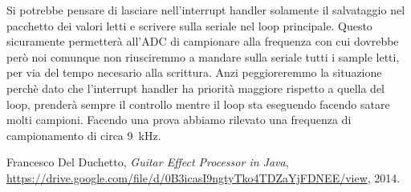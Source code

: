 \documentclass[a4paper,11pt]{article}
\begin{document}
\vspace{0.2in}
Si potrebbe pensare di lasciare nell'interrupt handler solamente il salvataggio nel pacchetto dei valori letti e scrivere sulla seriale nel loop principale. Questo sicuramente permetterà all'ADC di campionare alla frequenza con cui dovrebbe però noi comunque non riusciremmo a mandare sulla seriale tutti i sample letti, per via del tempo necesario alla scrittura. Anzi peggioreremmo la situazione perchè dato che l'interrupt handler ha priorità maggiore rispetto a quella del loop, prenderà sempre il controllo mentre il loop sta eseguendo facendo satare molti campioni. Facendo una prova abbiamo rilevato una frequenza di campionamento di circa \SI{9}{\kilo\hertz}.

\begin{thebibliography}{9}

  Francesco Del Duchetto,
  \emph{Guitar Effect Processor in Java},
  \url{https://drive.google.com/file/d/0B3icasI9ngtyTko4TDZaYjFDNEE/view},
  2014.

\end{thebibliography}
\end{document}
